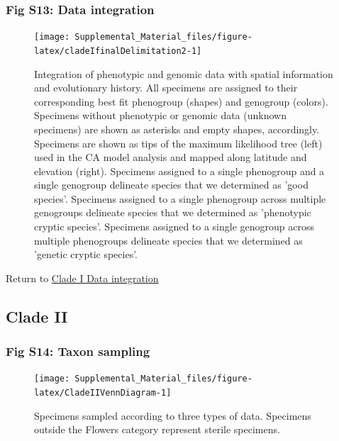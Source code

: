 \documentclass[
  11pt,
]{article}
\begin{document}
\hypertarget{fig-s13-data-integration}{%
\subsubsection{Fig S13: Data integration}\label{fig-s13-data-integration}}

\begin{figure}
\texttt{[image: Supplemental\_Material\_files/figure-latex/cladeIfinalDelimitation2-1]} \caption{Integration of phenotypic and genomic data with spatial information and evolutionary history. All specimens are assigned to their corresponding best fit phenogroup (shapes) and genogroup (colors). Specimens without phenotypic or genomic data (unknown specimens) are shown as asterisks and empty shapes, accordingly. Specimens are shown as tips of the maximum likelihood tree (left) used in the CA model analysis and mapped along latitude and elevation (right). Specimens assigned to a single phenogroup and a single genogroup delineate species that we determined as 'good species'. Specimens assigned to a single phenogroup across multiple genogroups delineate species that we determined as 'phenotypic cryptic species'. Specimens assigned to a single genogroup across multiple phenogroups delineate species that we determined as 'genetic cryptic species'.}\label{fig:cladeIfinalDelimitation2}
\end{figure}

Return to \protect\hyperlink{data-integration-1}{Clade I Data integration}
\pagebreak

\hypertarget{clade-ii-2}{%
\subsection{Clade II}\label{clade-ii-2}}

\hypertarget{fig-s14-taxon-sampling}{%
\subsubsection{Fig S14: Taxon sampling}\label{fig-s14-taxon-sampling}}

\begin{figure}

{\centering \texttt{[image: Supplemental\_Material\_files/figure-latex/CladeIIVennDiagram-1]} 

}

\caption{Specimens sampled according to three types of data. Specimens outside the Flowers category represent sterile specimens.}\label{fig:CladeIIVennDiagram}
\end{figure}
\end{document}
